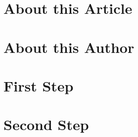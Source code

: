 \documentclass{llncs}
\begin{document}
\tableofcontents
\section*{About this Article}

\section*{About this Author} 

\section{First Step}
\section{Second Step}
\end{document}
